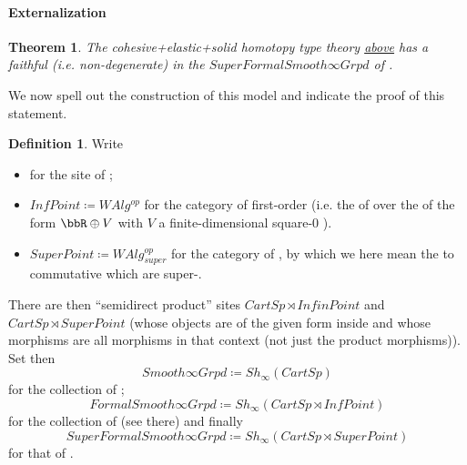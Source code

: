 \documentclass[12pt,titlepage]{article}
\theoremstyle{plain}
\newtheorem{theorem}{Theorem}
\theoremstyle{definition}
\newtheorem{defn}{Definition}
\theoremstyle{remark}
\begin{document}
\hypertarget{Externalization}{}\paragraph*{{Externalization}}\label{Externalization}
\begin{theorem}
\label{SupergeometryIsModel}\hypertarget{SupergeometryIsModel}{}
The cohesive+elastic+solid homotopy type theory \hyperlink{ObjectiveLogic}{above} has a faithful (i.e. non-degenerate)  in the  $SuperFormalSmooth\infty Grpd$ of .
\end{theorem}
We now spell out the construction of this model and indicate the proof of this statement.
\begin{defn}
\label{SupergeometricModel}\hypertarget{SupergeometricModel}{}
Write
\begin{itemize}%
\item {} for the site of ;
\item $InfPoint \coloneqq WAlg^{op}$ for the category of first-order  (i.e. the  of  over the  of the form $\bbR\oplus V$ with $V$ a finite-dimensional square-0 ).
\item $SuperPoint \coloneqq WAlg_{super}^{op}$ for the category of , by which we here mean the  to commutative  which are super-.
\end{itemize}
There are then ``semidirect product'' sites $CartSp \rtimes InfinPoint$ and $CartSp \rtimes SuperPoint$ (whose objects are  of the given form inside  and whose morphisms are all morphisms in that context (not just the product morphisms)).
Set then
\begin{displaymath}
Smooth \infty Grpd \coloneqq Sh_\infty(CartSp)
\end{displaymath}
for the collection of ;
\begin{displaymath}
FormalSmooth\infty Grpd \coloneqq Sh_\infty(CartSp \rtimes InfPoint)
\end{displaymath}
for the collection of  (see there) and finally
\begin{displaymath}
SuperFormalSmooth\infty Grpd \coloneqq Sh_\infty(CartSp \rtimes SuperPoint)
\end{displaymath}
for that of .
\end{defn}
\end{document}
